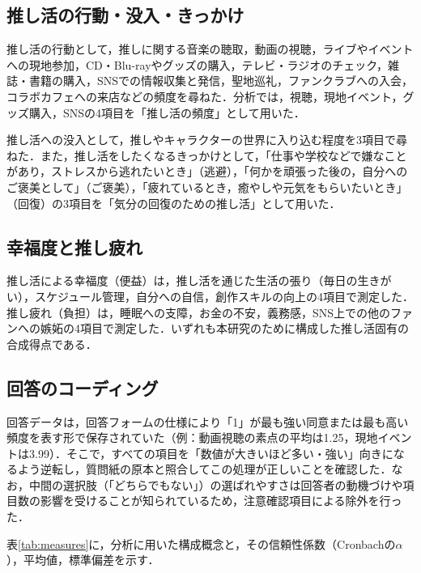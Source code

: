 \subsection{推し活の行動・没入・きっかけ}
推し活の行動として，推しに関する音楽の聴取，動画の視聴，ライブやイベントへの現地参加，CD・Blu-rayやグッズの購入，テレビ・ラジオのチェック，雑誌・書籍の購入，SNSでの情報収集と発信，聖地巡礼，ファンクラブへの入会，コラボカフェへの来店などの頻度を尋ねた．分析では，視聴，現地イベント，グッズ購入，SNSの4項目を「推し活の頻度」として用いた．

推し活への没入として，推しやキャラクターの世界に入り込む程度を3項目で尋ねた．また，推し活をしたくなるきっかけとして，「仕事や学校などで嫌なことがあり，ストレスから逃れたいとき」（逃避），「何かを頑張った後の，自分へのご褒美として」（ご褒美），「疲れているとき，癒やしや元気をもらいたいとき」（回復）の3項目を「気分の回復のための推し活」として用いた．

\subsection{幸福度と推し疲れ}
推し活による幸福度（便益）は，推し活を通じた生活の張り（毎日の生きがい），スケジュール管理，自分への自信，創作スキルの向上の4項目で測定した．推し疲れ（負担）は，睡眠への支障，お金の不安，義務感，SNS上での他のファンへの嫉妬の4項目で測定した．いずれも本研究のために構成した推し活固有の合成得点である．

\subsection{回答のコーディング}
回答データは，回答フォームの仕様により「1」が最も強い同意または最も高い頻度を表す形で保存されていた（例：動画視聴の素点の平均は1.25，現地イベントは3.99）．そこで，すべての項目を「数値が大きいほど多い・強い」向きになるよう逆転し，質問紙の原本と照合してこの処理が正しいことを確認した．なお，中間の選択肢（「どちらでもない」）の選ばれやすさは回答者の動機づけや項目数の影響を受けることが知られているため\cite{masuda2014}，注意確認項目による除外を行った．

表\ref{tab:measures}に，分析に用いた構成概念と，その信頼性係数（Cronbachの$\alpha$），平均値，標準偏差を示す．

